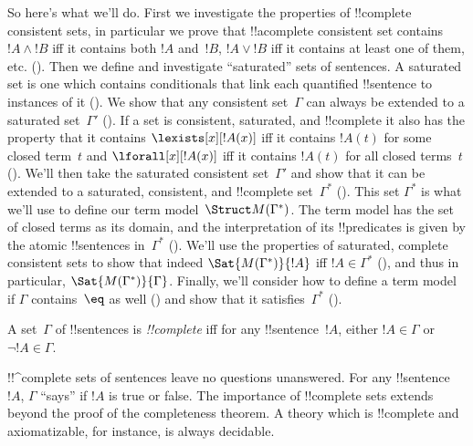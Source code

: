 So here's what we'll do. First we investigate the properties of
!!{complete} consistent sets, in particular we prove that
!!a{complete} consistent set contains $!A \land !B$ iff it contains
both $!A$ and~$!B$, $!A \lor !B$ iff it contains at least one of them,
etc. (). Then we define and
  investigate ``saturated'' sets of sentences. A saturated set is one
  which contains conditionals that link each quantified !!{sentence}
  to instances of it (). We show that any
  consistent set~$\Gamma$ can always be extended to a saturated
  set~$\Gamma'$ (). If a set is consistent,
  saturated, and !!{complete} it also has the property that it
  contains $\lexists[x][!A(x)]$ iff it contains $!A(t)$
    for some closed term~$t$ and
  $\lforall[x][!A(x)]$ iff it contains $!A(t)$ for all
    closed terms~$t$ ().
We'll then take the saturated consistent
set~$\Gamma'$ and show that it can be extended
to a saturated, consistent, and
!!{complete} set~$\Gamma^*$ (). This set
$\Gamma^*$ is what we'll use to define our term
  model~$\Struct M(\Gamma^*)$.
The term model has the set of closed terms as its domain,
  and the interpretation of its !!{predicate}s is given by the atomic
  !!{sentence}s in~$\Gamma^*$ ().  We'll
use the properties of saturated, complete consistent
sets to show that indeed
$\Sat{M(\Gamma^*)}{!A}$ iff $!A \in
\Gamma^*$ (), and thus in particular,
$\Sat{M(\Gamma^*)}{\Gamma}$.
Finally, we'll consider how to define a term model if
  $\Gamma$ contains~$\eq$ as well
  () and show that it
  satisfies~$\Gamma^*$ ().





      

\begin{defn}
 A set~$\Gamma$ of !!{sentence}s is
\emph{!!{complete}} iff for any !!{sentence}~$!A$, either $!A \in
\Gamma$ or $\lnot !A \in \Gamma$.
\end{defn}

\begin{explain}
!!^{complete} sets of sentences leave no questions unanswered. For
any !!{sentence}~$!A$, $\Gamma$ ``says'' if $!A$ is true or false.  The
importance of !!{complete} sets extends beyond the proof of the
completeness theorem. A theory which is !!{complete} and
axiomatizable, for instance, is always decidable.
\end{explain}

